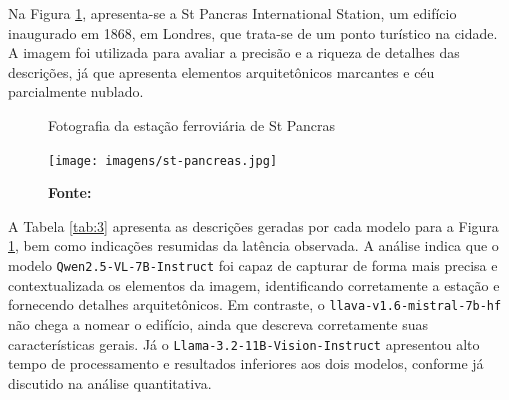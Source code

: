 Na Figura \ref{fig:8}, apresenta-se a St Pancras International Station, um edifício inaugurado em 1868, em Londres, que trata-se de um ponto turístico na cidade. A imagem foi utilizada para avaliar a precisão e a riqueza de detalhes das descrições, já que apresenta elementos arquitetônicos marcantes e céu parcialmente nublado.

\begin{figure}[!]
     \caption{Fotografia da estação ferroviária de St Pancras}
     \centering
     \texttt{[image: imagens/st-pancreas.jpg]}
     \label{fig:8}
     \caption*{\textbf{Fonte:} }
\end{figure}

A Tabela \ref{tab:3} apresenta as descrições geradas por cada modelo para a Figura \ref{fig:8}, bem como indicações resumidas da latência observada. A análise indica que o modelo \lstinline{Qwen2.5-VL-7B-Instruct} foi capaz de capturar de forma mais precisa e contextualizada os elementos da imagem, identificando corretamente a estação e fornecendo detalhes arquitetônicos. Em contraste, o \lstinline{llava-v1.6-mistral-7b-hf} não chega a nomear o edifício, ainda que descreva corretamente suas características gerais. Já o \lstinline{Llama-3.2-11B-Vision-Instruct} apresentou alto tempo de processamento e resultados inferiores aos dois modelos, conforme já discutido na análise quantitativa.

